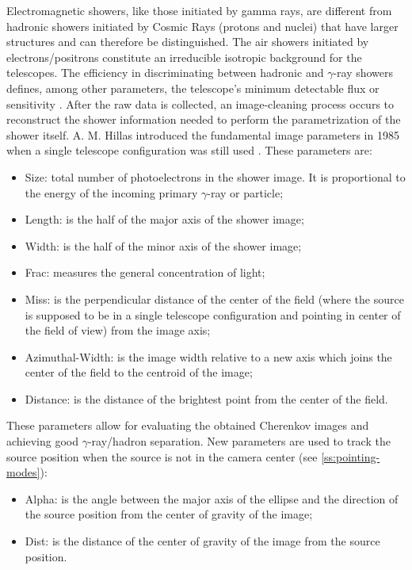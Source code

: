 Electromagnetic showers, like those initiated by gamma rays, are different from hadronic showers initiated by Cosmic Rays (protons and nuclei) that have larger structures and can therefore be distinguished. The air showers initiated by electrons/positrons constitute an irreducible isotropic background for the telescopes. The efficiency in discriminating between hadronic and $\gamma$-ray showers defines, among other parameters, the telescope's minimum detectable flux or sensitivity \cite{tampieri2020real}. After the raw data is collected, an image-cleaning process occurs to reconstruct the shower information needed to perform the parametrization of the shower itself. A. M. Hillas introduced the fundamental image parameters in 1985 when a single telescope configuration was still used \cite{hillas1985cerenkov}. These parameters are:
\begin{itemize}
    \item Size: total number of photoelectrons in the shower image. It is proportional to the energy of the incoming primary $\gamma$-ray or particle;
    \item Length: is the half of the major axis of the shower image;
    \item Width: is the half of the minor axis of the shower image;
    \item Frac: measures the general concentration of light;
    \item Miss: is the perpendicular distance of the center of the field (where the source is supposed to be in a single telescope configuration and pointing in center of the field of view) from the image axis;
    \item Azimuthal-Width: is the image width relative to a new axis which
joins the center of the field to the centroid of the image; 
    \item Distance: is the distance of the brightest point from the center of the
field.
\end{itemize}
These parameters allow for evaluating the obtained Cherenkov images and achieving good $\gamma$-ray/hadron separation. 
New parameters are used to track the source position when the source is not in the camera center (see \autoref{ss:pointing-modes}):
\begin{itemize}
    \item Alpha: is the angle between the major axis of the ellipse and the direction of the source position from the center of gravity of the image;
    \item Dist: is the distance of the center of gravity of the image from the source position.
\end{itemize}
